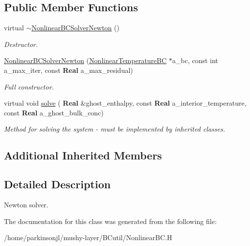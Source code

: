 \subsection*{Public Member Functions}
\begin{DoxyCompactItemize}
\item 
\mbox{\label{class_nonlinear_b_c_solver_newton_a67236cd2fbb2c5ac235caaf282949ca0}} 
virtual \hyperlink{class_nonlinear_b_c_solver_newton_a67236cd2fbb2c5ac235caaf282949ca0}{$\sim$\+Nonlinear\+B\+C\+Solver\+Newton} ()
\begin{DoxyCompactList}\small\item\em Destructor. \end{DoxyCompactList}\item 
\mbox{\label{class_nonlinear_b_c_solver_newton_a31ed26d827f9dee8dc655e102e039ad2}} 
\hyperlink{class_nonlinear_b_c_solver_newton_a31ed26d827f9dee8dc655e102e039ad2}{Nonlinear\+B\+C\+Solver\+Newton} (\hyperlink{class_nonlinear_temperature_b_c}{Nonlinear\+Temperature\+BC} $\ast$a\+\_\+bc, const int a\+\_\+max\+\_\+iter, const \textbf{ Real} a\+\_\+max\+\_\+residual)
\begin{DoxyCompactList}\small\item\em Full constructor. \end{DoxyCompactList}\item 
\mbox{\label{class_nonlinear_b_c_solver_newton_a0243e3e99c1667ee84b83603a4cbb7c0}} 
virtual void \hyperlink{class_nonlinear_b_c_solver_newton_a0243e3e99c1667ee84b83603a4cbb7c0}{solve} (\textbf{ Real} \&ghost\+\_\+enthalpy, const \textbf{ Real} a\+\_\+interior\+\_\+temperature, const \textbf{ Real} a\+\_\+ghost\+\_\+bulk\+\_\+conc)
\begin{DoxyCompactList}\small\item\em Method for solving the system -\/ must be implemented by inherited classes. \end{DoxyCompactList}\end{DoxyCompactItemize}
\subsection*{Additional Inherited Members}


\subsection{Detailed Description}
Newton solver. 

The documentation for this class was generated from the following file\+:\begin{DoxyCompactItemize}
\item 
/home/parkinsonjl/mushy-\/layer/\+B\+Cutil/Nonlinear\+B\+C.\+H\end{DoxyCompactItemize}
